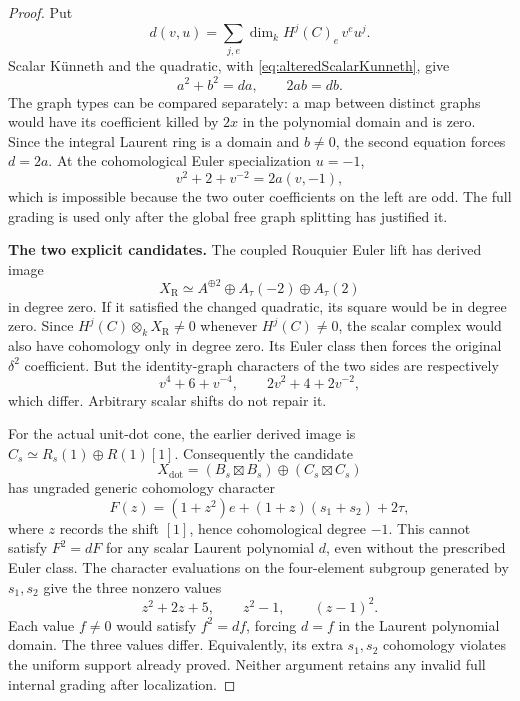 \documentclass[11pt,a4paper]{article}
\theoremstyle{named}\newtheorem{finding}{Finding}[section]
\theoremstyle{definition}\newtheorem{definition}[finding]{Definition}
\theoremstyle{remark}\newtheorem{remark}[finding]{Remark}
\begin{document}
\begin{proof}
Put
\[
 d(v,u)=\sum_{j,e}\dim_kH^j(C)_e\,v^e u^j.
\]
Scalar K\"unneth and the quadratic, with
\eqref{eq:alteredScalarKunneth}, give
\begin{equation}\label{eq:alteredScalarMultiplicityEquations}
                     a^2+b^2=da,\qquad 2ab=db.
\end{equation}
The graph types can be compared separately: a map
between distinct graphs would have its coefficient
killed by \(2x\) in the polynomial domain and is zero.
Since the integral Laurent ring is a domain and
\(b\ne0\), the second equation forces \(d=2a\).
At the cohomological Euler specialization \(u=-1\),
\[
                   v^2+2+v^{-2}=2a(v,-1),
\]
which is impossible because the two outer coefficients
on the left are odd. The full grading is used only
after the global free graph splitting has justified it.

\par\smallskip\noindent\textbf{The two explicit candidates.}\quad
The coupled Rouquier Euler lift has derived image
\[
 X_{\mathrm R}\simeq A^{\oplus2}
                      \oplus A_\tau(-2)\oplus A_\tau(2)
\]
in degree zero. If it satisfied the changed quadratic,
its square would be in degree zero. Since
\(H^j(C)\otimes_kX_{\mathrm R}\ne0\) whenever
\(H^j(C)\ne0\), the scalar complex would also have
cohomology only in degree zero. Its Euler class then
forces the original \(\delta^2\) coefficient.
But the identity-graph characters of the two sides are
respectively
\[
                  v^4+6+v^{-4},\qquad
                  2v^2+4+2v^{-2},
\]
which differ. Arbitrary scalar shifts do not repair it.

For the actual unit-dot cone, the earlier derived image
is \(C_s\simeq R_s(1)\oplus R(1)[1]\).
Consequently the candidate
\[
 X_{\mathrm{dot}}=(B_s\boxtimes B_s)
                       \oplus(C_s\boxtimes C_s)
\]
has ungraded generic cohomology character
\begin{equation}\label{eq:alteredScalarDotCharacter}
 F(z)=(1+z^2)e+(1+z)(s_1+s_2)+2\tau,
\end{equation}
where \(z\) records the shift \([1]\), hence
cohomological degree \(-1\). This cannot satisfy
\(F^2=dF\) for any scalar Laurent polynomial \(d\),
even without the prescribed Euler class.
The character evaluations on the four-element subgroup
generated by \(s_1,s_2\) give the three nonzero values
\[
                    z^2+2z+5,\qquad z^2-1,\qquad (z-1)^2.
\]
Each value \(f\ne0\) would satisfy \(f^2=df\),
forcing \(d=f\) in the Laurent polynomial domain.
The three values differ. Equivalently, its extra
\(s_1,s_2\) cohomology violates the uniform support
already proved. Neither argument retains any invalid
full internal grading after localization.
\end{proof}
\end{document}
